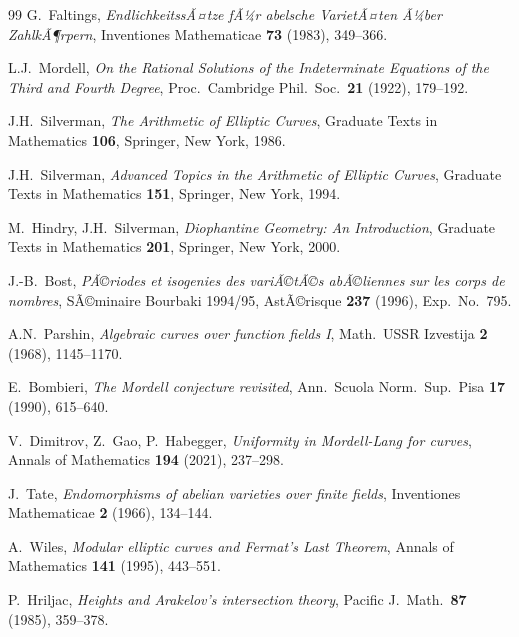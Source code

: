 ﻿\documentclass[12pt,a4paper]{article}
\theoremstyle{plain}
\theoremstyle{definition}
\theoremstyle{remark}
\begin{document}
\begin{thebibliography}{99}
G.\ Faltings,
\textit{EndlichkeitssÃ¤tze fÃ¼r abelsche VarietÃ¤ten Ã¼ber ZahlkÃ¶rpern},
Inventiones Mathematicae \textbf{73} (1983), 349--366.

L.J.\ Mordell,
\textit{On the Rational Solutions of the Indeterminate Equations of the Third and Fourth Degree},
Proc.\ Cambridge Phil.\ Soc.\ \textbf{21} (1922), 179--192.

J.H.\ Silverman,
\textit{The Arithmetic of Elliptic Curves},
Graduate Texts in Mathematics \textbf{106}, Springer, New York, 1986.

J.H.\ Silverman,
\textit{Advanced Topics in the Arithmetic of Elliptic Curves},
Graduate Texts in Mathematics \textbf{151}, Springer, New York, 1994.

M.\ Hindry, J.H.\ Silverman,
\textit{Diophantine Geometry: An Introduction},
Graduate Texts in Mathematics \textbf{201}, Springer, New York, 2000.

J.-B.\ Bost,
\textit{PÃ©riodes et isogenies des variÃ©tÃ©s abÃ©liennes sur les corps de nombres},
SÃ©minaire Bourbaki 1994/95, AstÃ©risque \textbf{237} (1996), Exp.\ No.\ 795.

A.N.\ Parshin,
\textit{Algebraic curves over function fields I},
Math.\ USSR Izvestija \textbf{2} (1968), 1145--1170.

E.\ Bombieri,
\textit{The Mordell conjecture revisited},
Ann.\ Scuola Norm.\ Sup.\ Pisa \textbf{17} (1990), 615--640.

V.\ Dimitrov, Z.\ Gao, P.\ Habegger,
\textit{Uniformity in Mordell-Lang for curves},
Annals of Mathematics \textbf{194} (2021), 237--298.

J.\ Tate,
\textit{Endomorphisms of abelian varieties over finite fields},
Inventiones Mathematicae \textbf{2} (1966), 134--144.

A.\ Wiles,
\textit{Modular elliptic curves and Fermat's Last Theorem},
Annals of Mathematics \textbf{141} (1995), 443--551.

P.\ Hriljac,
\textit{Heights and Arakelov's intersection theory},
Pacific J.\ Math.\ \textbf{87} (1985), 359--378.
\end{thebibliography}
\end{document}
